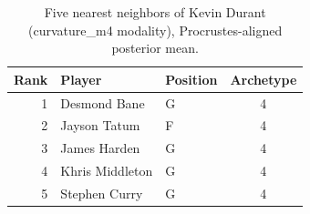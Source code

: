 \begin{table}[htbp]
  \centering\small
  \begin{tabular}{rllc}
    \toprule
    Rank & Player & Position & Archetype \\
    \midrule
    1 & Desmond Bane & G & 4 \\
    2 & Jayson Tatum & F & 4 \\
    3 & James Harden & G & 4 \\
    4 & Khris Middleton & G & 4 \\
    5 & Stephen Curry & G & 4 \\
    \bottomrule
  \end{tabular}
  \caption{Five nearest neighbors of Kevin Durant (curvature_m4 modality), Procrustes-aligned posterior mean.}
  \label{tab:Kevin_Durant_neighbors_curvature_m4}
\end{table}

